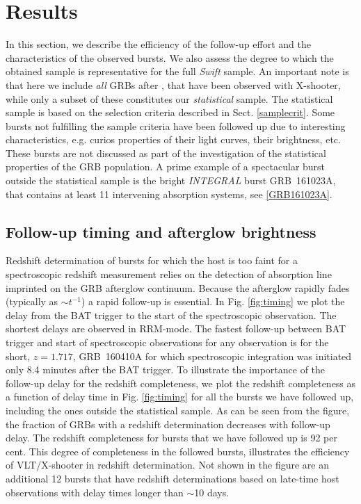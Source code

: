 \documentclass{aa}    %
\begin{document}
\section{Results} \label{results}

In this section, we describe the efficiency of the follow-up effort and the
characteristics of the observed bursts. We also assess the degree to which the
obtained sample is representative for the full \textit{Swift} sample. An
important note is that here we include \textit{all} GRBs after \startdate, that
have been observed with X-shooter, while only a subset of these constitutes our
\textit{statistical} sample. The statistical sample is based on the selection
criteria described in Sect. \ref{samplecrit}. Some bursts not fulfilling the
sample criteria have been followed up due to interesting characteristics, e.g.
curios properties of their light curves, their brightness, etc. These bursts
are not discussed as part of the investigation of the statistical properties of
the GRB population. A prime example of a spectacular burst outside the
statistical sample is the bright \textit{INTEGRAL} burst GRB~161023A, that
contains at least 11 intervening absorption systems, see \ref{GRB161023A}.


\subsection{Follow-up timing and afterglow brightness} \label{timing}

Redshift determination of bursts for which the host is too faint for a
spectroscopic redshift measurement relies on the detection of absorption line
imprinted on the GRB afterglow continuum. Because the afterglow rapidly fades
(typically as $\sim t^{-1}$) a rapid follow-up is essential. In Fig.
\ref{fig:timing} we plot the delay from the BAT trigger to the start of the
spectroscopic observation. The shortest delays are observed in RRM-mode. The
fastest follow-up between BAT trigger and start of spectroscopic observations for any observation is for the short, $z = 1.717$, GRB~160410A for which spectroscopic
integration was initiated only 8.4 minutes after the BAT trigger. To illustrate
the importance of the follow-up delay for the redshift completeness, we plot the
redshift completeness as a function of delay time in Fig. \ref{fig:timing} for
all the bursts we have followed up, including the ones outside the statistical
sample. As can be seen from the figure, the fraction of GRBs with a redshift
determination decreases with follow-up delay. The redshift completeness
for bursts that we have followed up is 92 per cent. This degree of completeness
in the followed bursts, illustrates the efficiency of VLT/X-shooter in redshift
determination. Not shown in the figure are an additional 12 bursts that have
redshift determinations based on late-time host observations with delay times
longer than $\sim$10 days.
\end{document}

